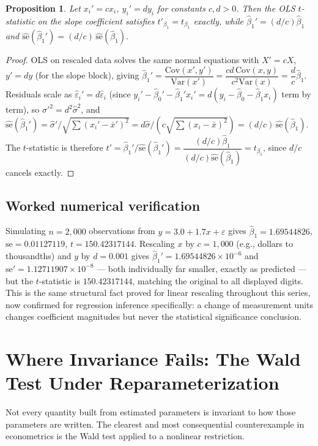 \documentclass[10pt,journal,compsoc]{IEEEtran}
\newtheorem{proposition}{Proposition}
\begin{document}
\begin{proposition}
Let $x_i' = cx_i$, $y_i'=dy_i$ for constants $c,d>0$. Then the OLS $t$-statistic on the slope coefficient satisfies $t'_{\beta_1} = t_{\beta_1}$ exactly, while $\hat\beta_1' = (d/c)\hat\beta_1$ and $\widehat{\mathrm{se}}(\hat\beta_1') = (d/c)\,\widehat{\mathrm{se}}(\hat\beta_1)$.
\end{proposition}
\begin{proof}
OLS on rescaled data solves the same normal equations with $X'=cX$, $y'=dy$ (for the slope block), giving $\hat\beta_1' = \dfrac{\mathrm{Cov}(x',y')}{\mathrm{Var}(x')} = \dfrac{cd\,\mathrm{Cov}(x,y)}{c^2\mathrm{Var}(x)} = \dfrac{d}{c}\hat\beta_1$. Residuals scale as $\hat\varepsilon_i' = d\hat\varepsilon_i$ (since $y_i'-\hat\beta_0'-\hat\beta_1'x_i' = d(y_i-\hat\beta_0-\hat\beta_1x_i)$ term by term), so $\hat\sigma'^2 = d^2\hat\sigma^2$, and $\widehat{\mathrm{se}}(\hat\beta_1') = \hat\sigma'/\sqrt{\sum(x_i'-\bar x')^2} = d\hat\sigma / (c\sqrt{\sum(x_i-\bar x)^2}) = (d/c)\,\widehat{\mathrm{se}}(\hat\beta_1)$. The $t$-statistic is therefore $t'=\hat\beta_1'/\widehat{\mathrm{se}}(\hat\beta_1') = \dfrac{(d/c)\hat\beta_1}{(d/c)\widehat{\mathrm{se}}(\hat\beta_1)} = t_{\beta_1}$, since $d/c$ cancels exactly.
\end{proof}

\subsection{Worked numerical verification}
Simulating $n=2{,}000$ observations from $y=3.0+1.7x+\varepsilon$ gives $\hat\beta_1=1.69544826$, $\mathrm{se}=0.01127119$, $t=150.42317144$. Rescaling $x$ by $c=1{,}000$ (e.g., dollars to thousandths) and $y$ by $d=0.001$ gives $\hat\beta_1'=1.69544826\times10^{-6}$ and $\mathrm{se}'=1.12711907\times10^{-8}$ — both individually far smaller, exactly as predicted — but the $t$-statistic is $150.42317144$, matching the original to all displayed digits. This is the same structural fact proved for linear rescaling throughout this series, now confirmed for regression inference specifically: a change of measurement units changes coefficient magnitudes but never the statistical significance conclusion.

\section{Where Invariance Fails: The Wald Test Under Reparameterization}
Not every quantity built from estimated parameters is invariant to how those parameters are written. The clearest and most consequential counterexample in econometrics is the Wald test applied to a nonlinear restriction.
\end{document}
